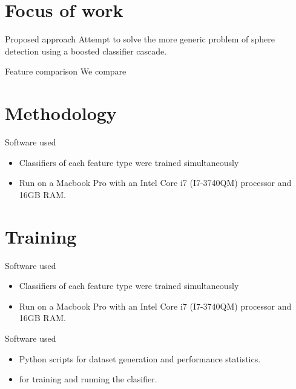 \documentclass{beamer}
\begin{document}
\section{Focus of work}
	\begin{frame}{Proposed approach}
		Attempt to solve the more generic problem of sphere detection using a boosted classifier cascade.
	\end{frame}

	\begin{frame}{Feature comparison}
		We compare 
	\end{frame}

\section{Methodology}
\begin{frame}{Software used}
	\begin{itemize}
		\item Classifiers of each feature type were trained simultaneously
		\item Run on a Macbook Pro with an Intel Core i7 (I7-3740QM) processor and 16GB RAM.
	\end{itemize}
\end{frame}


\section{Training}

\begin{frame}{Software used}
	\begin{itemize}
		\item Classifiers of each feature type were trained simultaneously
		\item Run on a Macbook Pro with an Intel Core i7 (I7-3740QM) processor and 16GB RAM.
	\end{itemize}
\end{frame}

\begin{frame}{Software used}
	\begin{itemize}
		\item Python scripts for dataset generation and performance statistics.
		\item \citet{opencv_library} for training and running the clasifier.
	\end{itemize}
\end{frame}
\end{document}
